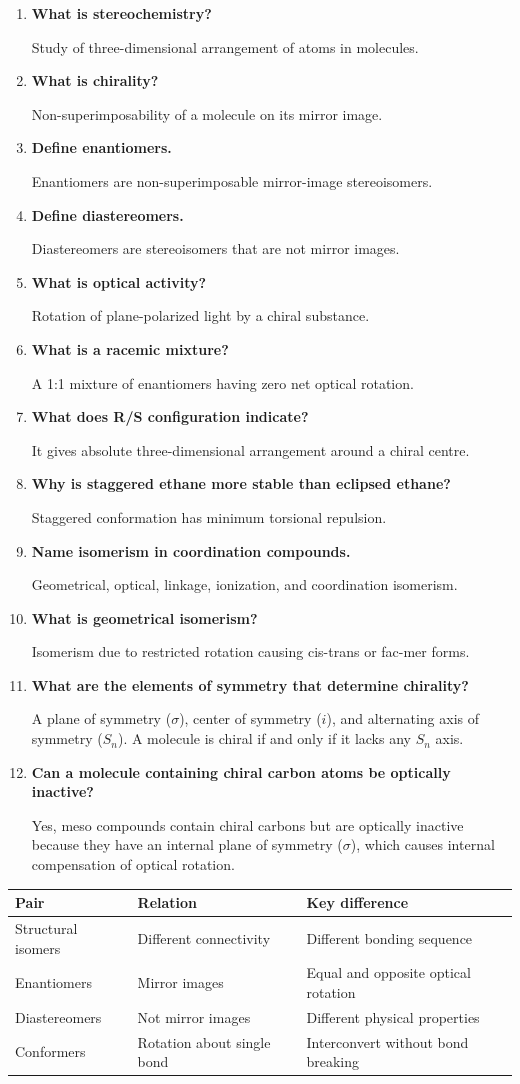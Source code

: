 \documentclass[12pt,a4paper]{article}
\newcommand{\Q}[1]{\textbf{#1}\par\noindent\ignorespaces}
\begin{document}
\begin{tcolorbox}[exambox, title={Frequently Asked / Viva Questions}]
\begin{enumerate}[topsep=0pt, label=\textbf{Q\arabic*.}, itemsep=5pt]
  \item \Q{What is stereochemistry?}
    Study of three-dimensional arrangement of atoms in molecules.
  \item \Q{What is chirality?}
    Non-superimposability of a molecule on its mirror image.
  \item \Q{Define enantiomers.}
    Enantiomers are non-superimposable mirror-image stereoisomers.
  \item \Q{Define diastereomers.}
    Diastereomers are stereoisomers that are not mirror images.
  \item \Q{What is optical activity?}
    Rotation of plane-polarized light by a chiral substance.
  \item \Q{What is a racemic mixture?}
    A 1:1 mixture of enantiomers having zero net optical rotation.
  \item \Q{What does R/S configuration indicate?}
    It gives absolute three-dimensional arrangement around a chiral centre.
  \item \Q{Why is staggered ethane more stable than eclipsed ethane?}
    Staggered conformation has minimum torsional repulsion.
  \item \Q{Name isomerism in coordination compounds.}
    Geometrical, optical, linkage, ionization, and coordination isomerism.
  \item \Q{What is geometrical isomerism?}
    Isomerism due to restricted rotation causing cis-trans or fac-mer forms.
  \item \Q{What are the elements of symmetry that determine chirality?}
    A plane of symmetry ($\sigma$), center of symmetry ($i$), and alternating axis of symmetry ($S_n$). A molecule is chiral if and only if it lacks any $S_n$ axis.
  \item \Q{Can a molecule containing chiral carbon atoms be optically inactive?}
    Yes, meso compounds contain chiral carbons but are optically inactive because they have an internal plane of symmetry ($\sigma$), which causes internal compensation of optical rotation.
\end{enumerate}
\end{tcolorbox}

\begin{tcolorbox}[tikzbox, title={Summary Reference Table}]
\begin{tabularx}{\linewidth}{|B{3cm}|Y|Y|}
\hline
\textbf{Pair} & \textbf{Relation} & \textbf{Key difference} \\
\hline
Structural isomers & Different connectivity & Different bonding sequence \\
\hline
Enantiomers & Mirror images & Equal and opposite optical rotation \\
\hline
Diastereomers & Not mirror images & Different physical properties \\
\hline
Conformers & Rotation about single bond & Interconvert without bond breaking \\
\hline
\end{tabularx}
\end{tcolorbox}
\end{document}
